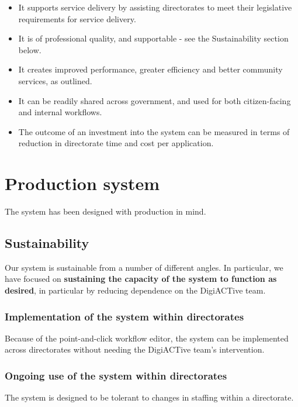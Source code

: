 \documentclass[12pt,a4paper,twosided]{article}
\begin{document}
\begin{itemize}

\item
  It supports service delivery by assisting directorates to meet their
  legislative requirements for service delivery.
\item
  It is of professional quality, and supportable - see the
  Sustainability section below.
\item
  It creates improved performance, greater efficiency and better
  community services, as outlined.
\item
  It can be readily shared across government, and used for both
  citizen-facing and internal workflows.
\item
  The outcome of an investment into the system can be measured in terms
  of reduction in directorate time and cost per application.
\end{itemize}

\newpage
\section{Production system}

The system has been designed with production in mind.

\subsection{Sustainability}

Our system is sustainable from a number of different angles. In
particular, we have focused on \textbf{sustaining the capacity of the
system to function as desired}, in particular by reducing dependence on
the DigiACTive team.

\subsubsection{Implementation of the system within directorates}

Because of the point-and-click workflow editor, the system can be
implemented across directorates without needing the DigiACTive team's
intervention.

\subsubsection{Ongoing use of the system within directorates}

The system is designed to be tolerant to changes in staffing within a
directorate.
\end{document}
